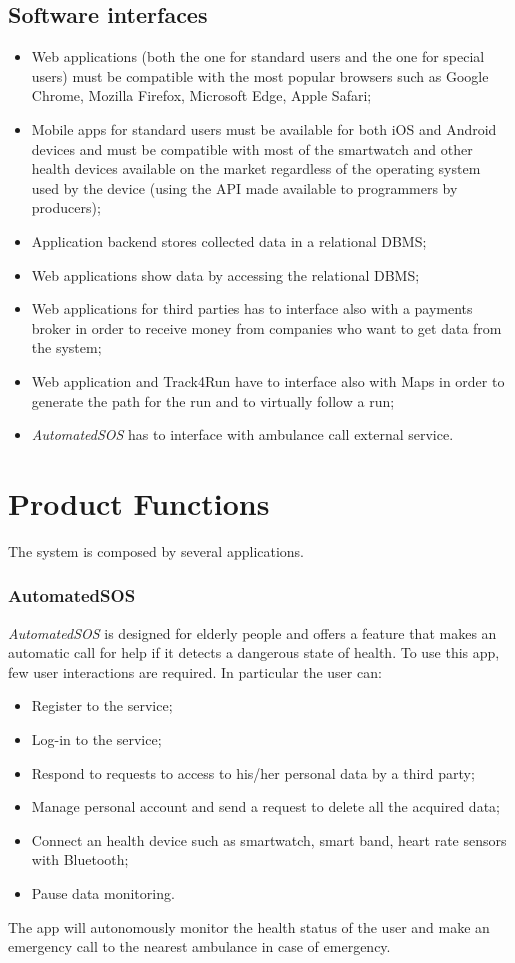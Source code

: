 \subsection{Software interfaces}\label{softwareInterfaces}
\begin{itemize}
\item Web applications (both the one for standard users and the one for special users) must be compatible with the most popular browsers such as Google Chrome, Mozilla Firefox, Microsoft Edge, Apple Safari;
\item	Mobile apps for standard users must be available for both iOS and Android devices and must be compatible with most of the smartwatch and other health devices available on the market regardless of the operating system used by the device (using the API made available to programmers by producers);
\item	Application backend stores collected data in a relational DBMS;
\item	 Web applications show data by accessing the relational DBMS;
\item	 Web applications for third parties has to interface also with a payments broker in order to receive money from companies who want to get data from the system;
\item Web application and Track4Run have to interface also with Maps in order to generate the path for the run and to virtually follow a run;
\item \textit{AutomatedSOS} has to interface with ambulance call external service.
\end{itemize}

\section{Product Functions}
The system is composed by several applications.
\subsubsection{AutomatedSOS}
\textit{AutomatedSOS} is designed for elderly people and offers a feature that makes an automatic call for help if it detects a dangerous state of health.
To use this app, few user interactions are required.
In particular the user can:
\begin{itemize}
\item Register to the service;
\item Log-in to the service;
\item Respond to requests to access to his/her personal data by a third party;
\item Manage personal account and send a request to delete all the acquired data;
\item Connect an health device such as smartwatch, smart band, heart rate sensors with Bluetooth;
\item Pause data monitoring.
\end{itemize}
The app will autonomously monitor the health status of the user and make an emergency call to the nearest ambulance in case of emergency.


